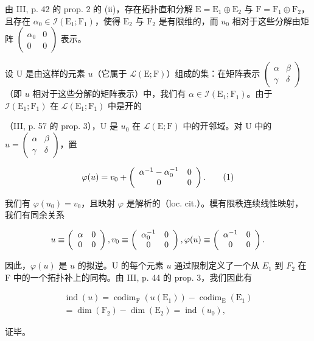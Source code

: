 由 III, p. 42 的 prop. 2 的 (ii)，存在拓扑直和分解 \(\mathrm{E} = \mathrm{E}_1 \oplus \mathrm{E}_2\) 与 \(\mathrm{F} = \mathrm{F}_1 \oplus \mathrm{F}_2\)，且存在 \(\alpha_0 \in \mathcal{I}(\mathrm{E}_1; \mathrm{F}_1)\)，使得 \(\mathrm{E}_2\) 与 \(\mathrm{F}_2\) 是有限维的，而 \(u_0\) 相对于这些分解由矩阵 \(\left( \begin{array}{cc}\alpha_0 & 0\\ 0 & 0 \end{array} \right)\) 表示。

设 U 是由这样的元素 \(u\)（它属于 \(\mathcal{L}(\mathrm{E};\mathrm{F})\)）组成的集：在矩阵表示 \(\left( \begin{array}{cc}\alpha & \beta \\ \gamma & \delta \end{array} \right)\)（即 \(u\) 相对于这些分解的矩阵表示）中，我们有 \(\alpha \in \mathcal{I}(\mathrm{E}_1;\mathrm{F}_1)\)。由于 \(\mathcal{I}(\mathrm{E}_1;\mathrm{F}_1)\) 在 \(\mathcal{L}(\mathrm{E}_1;\mathrm{F}_1)\) 中是开的

（III, p. 57 的 prop. 3），U 是 \(u_0\) 在 \(\mathcal{L}(\mathrm{E};\mathrm{F})\) 中的开邻域。对 U 中的 \(u = \begin{pmatrix} \alpha & \beta \\ \gamma & \delta \end{pmatrix}\)，置

\[
\varphi (u) = v _ {0} + \left( \begin{array}{c c} \alpha^ {- 1} - \alpha_ {0} ^ {- 1} & 0 \\ 0 & 0 \end{array} \right).\tag{1}
\]

我们有 \(\varphi(u_{0}) = v_{0}\)，且映射 \(\varphi\) 是解析的（loc. cit.）。模有限秩连续线性映射，我们有同余关系

\[
u \equiv \left( \begin{array}{c c} \alpha & 0 \\ 0 & 0 \end{array} \right) , v _ {0} \equiv \left( \begin{array}{c c} \alpha_ {0} ^ {- 1} & 0 \\ 0 & 0 \end{array} \right) , \varphi (u) \equiv \left( \begin{array}{c c} \alpha^ {- 1} & 0 \\ 0 & 0 \end{array} \right).
\]

因此，\(\varphi(u)\) 是 \(u\) 的拟逆。U 的每个元素 \(u\) 通过限制定义了一个从 \(E _1\) 到 \(F _2\) 在 F 中的一个拓扑补上的同构。由 III, p. 44 的 prop. 3，我们因此有

\[
\begin{array}{c} \operatorname{ind} (u) = \operatorname{codim} _ {\mathrm{F}} (u (\mathrm{E} _ {1})) - \operatorname{codim} _ {\mathrm{E}} (\mathrm{E} _ {1}) \\ = \dim (\mathrm{F} _ {2}) - \dim (\mathrm{E} _ {2}) = \operatorname{ind} (u _ {0}), \end{array}
\]

证毕。